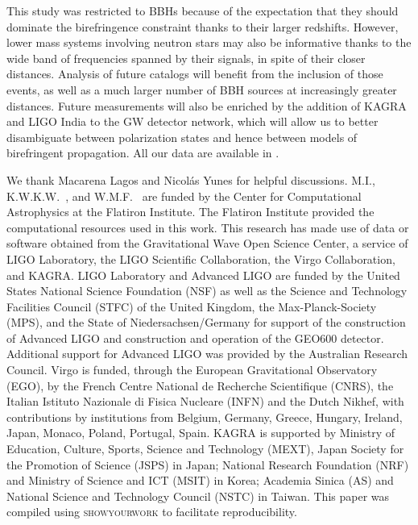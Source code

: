 \documentclass[aps,prd,twocolumn,superscriptaddress,preprintnumbers,nofootinbib]{revtex4-2}
\begin{document}
This study was restricted to \acp{BBH} because of the expectation that they should dominate the birefringence constraint thanks to their larger redshifts.
However, lower mass systems involving neutron stars may also be informative thanks to the wide band of frequencies spanned by their signals, in spite of their closer distances.
Analysis of future catalogs will benefit from the inclusion of those events, as well as a much larger number of \ac{BBH} sources at increasingly greater distances.
Future measurements will also be enriched by the addition of KAGRA \cite{KAGRA} and LIGO India to the \ac{GW} detector network, which will allow us to better disambiguate between polarization states and hence between models of birefringent propagation.
All our data are available in \citet{dataset}.

\begin{acknowledgments}
We thank Macarena Lagos and Nicol\'as Yunes for helpful discussions.
M.I., K.W.K.W.~, and W.M.F.~ are funded by the Center for Computational Astrophysics at the Flatiron Institute.
The Flatiron Institute provided the computational resources used in this work.
This research has made use of data or software obtained from the Gravitational Wave Open Science Center, a service of LIGO Laboratory, the LIGO Scientific Collaboration, the Virgo Collaboration, and KAGRA.
LIGO Laboratory and Advanced LIGO are funded by the United States National Science Foundation (NSF) as well as the Science and Technology Facilities Council (STFC) of the United Kingdom, the Max-Planck-Society (MPS), and the State of Niedersachsen/Germany for support of the construction of Advanced LIGO and construction and operation of the GEO600 detector.
Additional support for Advanced LIGO was provided by the Australian Research Council.
Virgo is funded, through the European Gravitational Observatory (EGO), by the French Centre National de Recherche Scientifique (CNRS), the Italian Istituto Nazionale di Fisica Nucleare (INFN) and the Dutch Nikhef, with contributions by institutions from Belgium, Germany, Greece, Hungary, Ireland, Japan, Monaco, Poland, Portugal, Spain.
KAGRA is supported by Ministry of Education, Culture, Sports, Science and Technology (MEXT), Japan Society for the Promotion of Science (JSPS) in Japan; National Research Foundation (NRF) and Ministry of Science and ICT (MSIT) in Korea; Academia Sinica (AS) and National Science and Technology Council (NSTC) in Taiwan.
This paper was compiled using \textsc{showyourwork} \cite{Luger2021} to facilitate reproducibility.
\end{acknowledgments}
\end{document}
